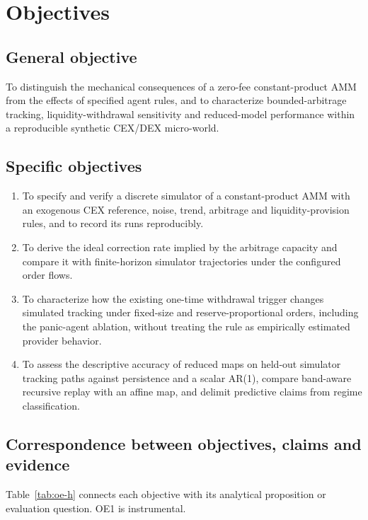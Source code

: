 \chapter{Objectives}
\label{cap:objetivos}

\section{General objective}

To distinguish the mechanical consequences of a zero-fee constant-product AMM from the effects of specified agent rules, and to characterize bounded-arbitrage tracking, liquidity-withdrawal sensitivity and reduced-model performance within a reproducible synthetic CEX/DEX micro-world.

\section{Specific objectives}

\begin{enumerate}[label=\textbf{OE\arabic*.}, leftmargin=3em]
  \item To specify and verify a discrete simulator of a constant-product AMM with an exogenous CEX reference, noise, trend, arbitrage and liquidity-provision rules, and to record its runs reproducibly.
  \item To derive the ideal correction rate implied by the arbitrage capacity and compare it with finite-horizon simulator trajectories under the configured order flows.
  \item To characterize how the existing one-time withdrawal trigger changes simulated tracking under fixed-size and reserve-proportional orders, including the panic-agent ablation, without treating the rule as empirically estimated provider behavior.
  \item To assess the descriptive accuracy of reduced maps on held-out simulator tracking paths against persistence and a scalar AR(1), compare band-aware recursive replay with an affine map, and delimit predictive claims from regime classification.
\end{enumerate}

\section{Correspondence between objectives, claims and evidence}

Table~\ref{tab:oe-h} connects each objective with its analytical proposition or evaluation question. OE1 is instrumental.

